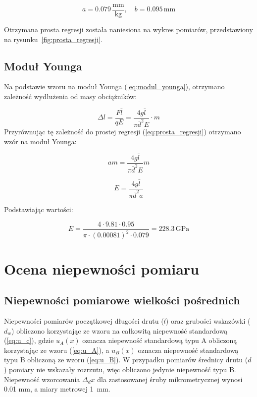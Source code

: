 \documentclass[a4paper,12pt]{article}
\begin{document}
\begin{equation}
    a = 0.079\,\frac{\text{mm}}{\text{kg}}, \quad
    b = 0.095\,\text{mm}
\end{equation}

Otrzymana prosta regresji została naniesiona na wykres pomiarów, przedstawiony na rysunku~\ref{fig:prosta_regresji}.

\subsection{Moduł Younga}

Na podstawie wzoru na moduł Younga (\ref{eq:modul_younga}), otrzymano zależność wydłużenia od masy obciążników:

\begin{equation}
    \Delta l = \frac{F\bar{l}}{qE} = \frac{4g\bar{l}}{\pi\bar{d}^2 E}\cdot m
\end{equation}
Przyrównując tę zależność do prostej regresji (\ref{eq:prosta_regresji}) otrzymano wzór na moduł Younga:

$$
    am = \frac{4g\bar{l}}{\pi\bar{d}^2 E}m
$$

$$
    E = \frac{4g\bar{l}}{\pi\bar{d}^2 a}
$$

Podstawiając wartości:


\begin{equation}
    E = \frac{4 \cdot 9.81 \cdot 0.95}{\pi \cdot (0.00081)^2 \cdot 0.079} = 228.3 \,\text{GPa}
\end{equation}

\section{Ocena niepewności pomiaru}


\subsection{Niepewności pomiarowe wielkości pośrednich}

Niepewności pomiarów początkowej długości drutu ($l$) oraz  grubości wskazówki ($d_w$) obliczono korzystając ze wzoru na całkowitą niepewność standardową (\ref{eq:u_c}), gdzie $u_A(x)$ oznacza niepewność standardową typu A obliczoną korzystając ze wzoru (\ref{eq:u_A}), a $u_B(x)$ oznacza niepewność standardową typu B obliczoną ze wzoru (\ref{eq:u_B}).
W przypadku pomiarów średnicy drutu ($d$) pomiary nie wskazały rozrzutu, więc obliczono jedynie niepewność typu B.
Niepewność wzorcowania \( \Delta_d x \) dla zastosowanej śruby mikrometrycznej wynosi 0.01 mm, a miary metrowej 1~mm.
\end{document}
